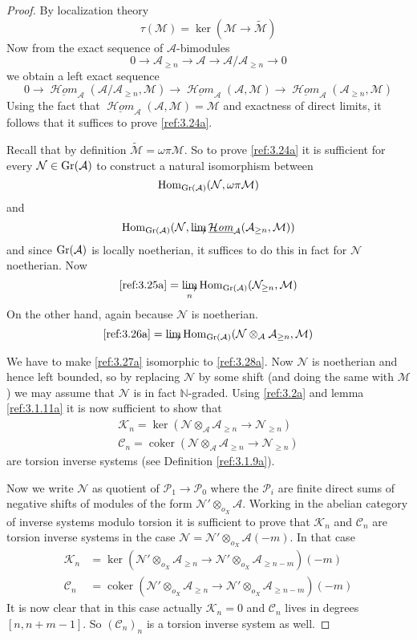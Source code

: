 \documentclass{amsproc}
\def \NN{{\mathbb N}}
\def\Ascr{{\mathcal A}}
\def\Cscr{{\mathcal C}}
\def\Hscr{{\mathcal H}}
\def\Kscr{{\mathcal K}}
\def\Mscr{{\mathcal M}}
\def\Nscr{{\mathcal N}}
\def\Pscr{{\mathcal P}}
\def\HHom{\operatorname {\Hscr \mathit{om}}}
\def\Gr{\mathop{\text{Gr}}}
\def\ox{{o_X}}
\def\Hom{\operatorname {Hom}}
\def\HHom{\operatorname {\Hscr \mathit{om}}}
\def\coker{\operatorname {coker}}
\def\ker{\operatorname {ker}}
\def\r{\rightarrow}
\let\oldtext\text
\def\text#1{\oldtext{\upshape #1}}
\theoremstyle{definition}
\theoremstyle{remark}
\def\dirlim{\mathop{\vtop{\baselineskip -100pt\lineskip -1pt\lineskiplimit 0pt
\setbox0\hbox{\upshape lim}\copy0\hbox to \wd0{\rightarrowfill}}}\limits}
\numberwithin{equation}{section}
\numberwithin{table}{section}
\numberwithin{figure}{section}
\def\Gr{\mathop{\text{Gr}}}
\begin{document}
\begin{proof}
By localization theory
\[
\tau(\Mscr)=\ker(\Mscr\r \tilde{\Mscr})
\]
Now from the exact sequence of $\Ascr$-bimodules 
\[
0\r\Ascr_{\ge n}\r \Ascr\r \Ascr/\Ascr_{\ge n}\r 0
\]
we obtain a
left exact sequence
\[
0\r\underline{\HHom}_\Ascr(\Ascr/\Ascr_{\ge n},\Mscr)\r
\underline{\HHom}_\Ascr(\Ascr,\Mscr)\r
\underline{\HHom}_\Ascr(\Ascr_{\ge n},\Mscr)
\]
Using the fact that $\underline{\HHom}_\Ascr(\Ascr,\Mscr)=\Mscr$ and
exactness of direct limits, it follows that it suffices to prove
\eqref{ref:3.24a}.

Recall that by definition $\tilde{\Mscr}=\omega\pi\Mscr$. So to prove
\eqref{ref:3.24a} it is sufficient for every $\Nscr\in\Gr(\Ascr)$ to
construct a natural isomorphism between \begin{equation}
\label{ref:3.25a}
\Hom_{\Gr(\Ascr)}(\Nscr,\omega\pi\Mscr)
\end{equation}
and
\begin{equation}
\label{ref:3.26a}
\Hom_{\Gr(\Ascr)}(\Nscr,\dirlim\underline{\HHom}_\Ascr(\Ascr_{\ge
  n},\Mscr))
\end{equation}
and since $\Gr(\Ascr)$ is locally noetherian, it suffices to do this
in fact for $\Nscr$ noetherian. Now
\begin{equation}
\label{ref:3.27a}
\eqref{ref:3.25a}=\dirlim_n \Hom_{\Gr(\Ascr)}(\Nscr_{\ge n},\Mscr)
\end{equation}
On the other hand, again because $\Nscr$ is noetherian.
\begin{equation}
\label{ref:3.28a}
\eqref{ref:3.26a}=\dirlim\Hom_{\Gr(\Ascr)}(\Nscr\otimes_\Ascr\Ascr_{\ge
  n},\Mscr)
\end{equation}

We have to make \eqref{ref:3.27a} isomorphic to \eqref{ref:3.28a}. Now $\Nscr$ is
noetherian and hence left bounded, so by replacing $\Nscr$ by some
shift (and doing the same with $\Mscr$) we may assume that $\Nscr$ is
in fact $\NN$-graded. Using \eqref{ref:3.2a} and lemma
\ref{ref:3.1.11a}   it is now sufficient to show
that 
\begin{align*}
\Kscr_n=\ker (\Nscr\otimes_\Ascr\Ascr_{\ge n}\r \Nscr_{\ge n})\\
\Cscr_n=\coker(\Nscr\otimes_\Ascr\Ascr_{\ge n}\r \Nscr_{\ge n})
\end{align*}
are torsion inverse systems (see Definition \ref{ref:3.1.9a}).

Now we write $\Nscr$ as quotient of $\Pscr_1\r\Pscr_0$ where the
$\Pscr_i$ are finite direct sums of negative shifts of modules of the
form $\Nscr'\otimes_\ox\Ascr$. Working in the abelian category of
inverse systems modulo torsion it is sufficient to prove that
$\Kscr_n$ and $\Cscr_n$ are torsion inverse systems in the case 
$\Nscr=\Nscr'\otimes_\ox\Ascr(-m)$. In that case
\begin{align*}
\Kscr_n&=\ker (\Nscr'\otimes_\ox\Ascr_{\ge n} \r
\Nscr'\otimes_\ox\Ascr_{\ge n-m})(-m)\\
\Cscr_n&=\coker (\Nscr'\otimes_\ox\Ascr_{\ge n} \r
\Nscr'\otimes_\ox\Ascr_{\ge n-m})(-m)
\end{align*}
It is now clear that in this case actually $\Kscr_n=0$ and $\Cscr_n$
lives in degrees $[n,n+m-1]$. So $(\Cscr_n)_n$ is a torsion inverse system
as well.
\end{proof}
\end{document}
